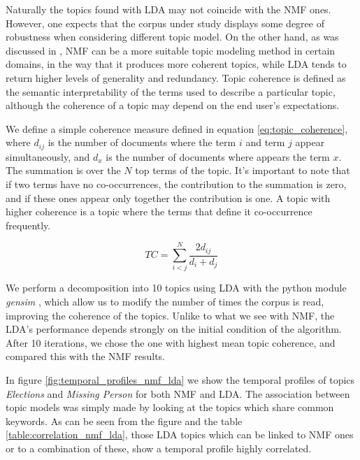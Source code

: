 \documentclass{bmcart}
\begin{document}
\par Naturally the topics found with LDA may not coincide with the NMF ones.
However, one expects that the corpus under study displays some degree of  robustness  when considering different topic model.
On the other hand, as was discussed in \cite{o2015analysis}, NMF can be a more suitable topic modeling method in certain domains, in the way that it produces more coherent topics, while LDA tends to return higher levels of generality and redundancy. Topic coherence is defined as the semantic interpretability of the terms used to describe a particular topic, although the coherence of a topic may depend on the end user's expectations.

\par We define a simple coherence measure defined in equation \ref{eq:topic_coherence}, where $d_{ij}$ is the number of documents where the term $i$ and term $j$ appear simultaneously, and $d_{x}$ is the number of documents where appears the term $x$. The summation is over the $N$ top terms of the topic.
It's important to note that if two terms have no co-occurrences, the contribution to the summation is zero, and if these ones appear only together the contribution is one.
A topic with higher coherence is a topic where the terms that define it co-occurrence frequently.

\begin{equation}
TC = \sum_{i < j}^N \frac{2d_{ij}}{d_i + d_j}
\label{eq:topic_coherence} 
\end{equation}

\par We perform a decomposition into 10 topics using LDA with the python module \emph{gensim} \cite{rehurek_lrec}, which allow us to modify the number of times the corpus is read, improving the coherence of the topics.
Unlike to what we see with NMF, the LDA's performance depends strongly on the initial condition of the algorithm. After 10 iterations, we chose the one with highest mean topic coherence, and compared this with the NMF results.

\par In figure \ref{fig:temporal_profiles_nmf_lda} we show the temporal profiles of topics \emph{Elections} and \emph{Missing Person} for both NMF and LDA. The association between topic models was simply made by looking at the topics which share common keywords.
As can be seen from the figure and the table \ref{table:correlation_nmf_lda}, those LDA topics which can be linked to NMF ones or to a combination of these, show a temporal profile highly correlated. 
\end{document}
